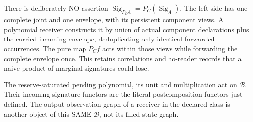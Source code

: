 \documentclass[11pt]{article}
\begin{document}
There is deliberately NO assertion $\operatorname{Sig}_{P_CA}=P_C(\operatorname{Sig}_A)$. The left side has one complete joint and one envelope, with its persistent component views. A polynomial receiver constructs it by union of actual component declarations plus the carried incoming envelope, deduplicating only identical forwarded occurrences. The pure map $P_Cf$ acts within those views while forwarding the complete envelope once. This retains correlations and no-reader records that a naive product of marginal signatures could lose.

\begin{theorem}
The reserve-saturated pending polynomial, its unit and multiplication act on $\mathcal B$. Their incoming-signature functors are the literal postcomposition functors just defined. The output observation graph of a receiver in the declared class is another object of this SAME $\mathcal B$, not its filled state graph.
\end{theorem}
\end{document}
